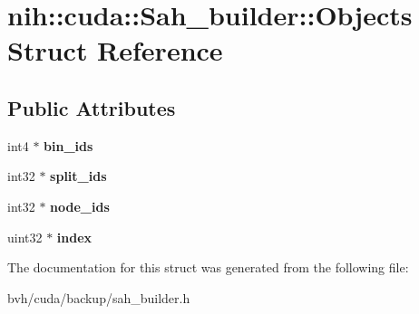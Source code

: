 \hypertarget{structnih_1_1cuda_1_1_sah__builder_1_1_objects}{
\section{nih\-:\-:cuda\-:\-:\-Sah\-\_\-builder\-:\-:\-Objects \-Struct \-Reference}
\label{structnih_1_1cuda_1_1_sah__builder_1_1_objects}
}
\subsection*{\-Public \-Attributes}
\begin{DoxyCompactItemize}
\item 
\hypertarget{structnih_1_1cuda_1_1_sah__builder_1_1_objects_ad038bc26a4e4ca433e2c255c05de038c}{
int4 $\ast$ {\bfseries bin\-\_\-ids}}
\label{structnih_1_1cuda_1_1_sah__builder_1_1_objects_ad038bc26a4e4ca433e2c255c05de038c}

\item 
\hypertarget{structnih_1_1cuda_1_1_sah__builder_1_1_objects_a50ae2705e3a3d61fd738f04862a18620}{
int32 $\ast$ {\bfseries split\-\_\-ids}}
\label{structnih_1_1cuda_1_1_sah__builder_1_1_objects_a50ae2705e3a3d61fd738f04862a18620}

\item 
\hypertarget{structnih_1_1cuda_1_1_sah__builder_1_1_objects_ac7057ed134798b2d824b16a414fbbad0}{
int32 $\ast$ {\bfseries node\-\_\-ids}}
\label{structnih_1_1cuda_1_1_sah__builder_1_1_objects_ac7057ed134798b2d824b16a414fbbad0}

\item 
\hypertarget{structnih_1_1cuda_1_1_sah__builder_1_1_objects_aac134a77600ec2b67629622dbe334ae1}{
uint32 $\ast$ {\bfseries index}}
\label{structnih_1_1cuda_1_1_sah__builder_1_1_objects_aac134a77600ec2b67629622dbe334ae1}

\end{DoxyCompactItemize}


\-The documentation for this struct was generated from the following file\-:\begin{DoxyCompactItemize}
\item 
bvh/cuda/backup/sah\-\_\-builder.\-h\end{DoxyCompactItemize}
